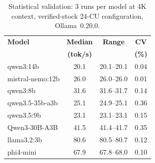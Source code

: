 \begin{table}[ht]
\caption{Statistical validation: 3 runs per model at 4K context,
verified-stock 24-CU configuration, Ollama~0.20.0.}\label{tab:stat_validation}
\centering
\small
\begin{tabular}{@{}lccc@{}}
\toprule
\textbf{Model} & \textbf{Median} & \textbf{Range} & \textbf{CV} \\
               & \textbf{(tok/s)} &                & \textbf{(\%)} \\
\otoprule
qwen3\!:\!14b & 20.1 & 20.1--20.1 & 0.04 \\
mistral-nemo\!:\!12b & 26.0 & 26.0--26.0 & 0.01 \\
qwen3\!:\!8b & 31.6 & 31.6--31.7 & 0.14 \\
qwen3.5-35b-a3b & 25.1 & 24.9--25.1 & 0.36 \\
qwen3.5\!:\!9b & 23.1 & 23.1--23.1 & 0.15 \\
Qwen3-30B-A3B & 41.5 & 41.4--41.7 & 0.35 \\
llama3.2\!:\!3b & 80.6 & 80.5--80.7 & 0.12 \\
phi4-mini & 67.9 & 67.8--68.0 & 0.10 \\
\bottomrule
\end{tabular}
\end{table}

